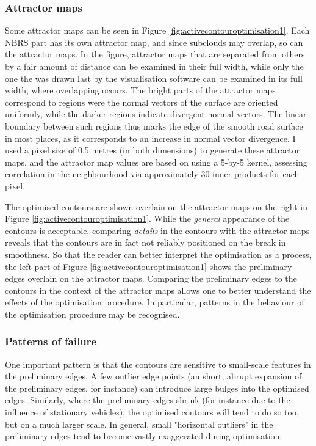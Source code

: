\subsubsection{Attractor maps}

Some attractor maps can be seen in Figure \ref{fig:activecontouroptimisation1}. Each NBRS part has its own attractor map, and since subclouds may overlap, so can the attractor maps. In the figure, attractor maps that are separated from others by a fair amount of distance can be examined in their full width, while only the one the was drawn last by the visualisation software can be examined in its full width, where overlapping occurs. The bright parts of the attractor maps correspond to regions were the normal vectors of the surface are oriented uniformly, while the darker regions indicate divergent normal vectors. The linear boundary between such regions thus marks the edge of the smooth road surface in most places, as it corresponds to an increase in normal vector divergence. I used a pixel size of 0.5 metres (in both dimensions) to generate these attractor maps, and the attractor map values are based on using a 5-by-5 kernel, assessing correlation in the neighbourhood via approximately 30 inner products for each pixel.

The optimised contours are shown overlain on the attractor maps on the right in Figure \ref{fig:activecontouroptimisation1}. While the \textit{general} appearance of the contours is acceptable, comparing \textit{details} in the contours with the attractor maps reveals that the contours are in fact not reliably positioned on the break in smoothness. So that the reader can better interpret the optimisation as a process, the left part of Figure \ref{fig:activecontouroptimisation1} shows the preliminary edges overlain on the attractor maps. Comparing the preliminary edges to the contours in the context of the attractor maps allows one to better understand the effects of the optimisation procedure. In particular, patterns in the behaviour of the optimisation procedure may be recognised.

\subsubsection{Patterns of failure}

One important pattern is that the contours are sensitive to small-scale features in the preliminary edges. A few outlier edge points (an short, abrupt expansion of the preliminary edges, for instance) can introduce large bulges into the optimised edges. Similarly, where the preliminary edges shrink (for instance due to the influence of stationary vehicles), the optimised contours will tend to do so too, but on a much larger scale. In general, small "horizontal outliers" in the preliminary edges tend to become vastly exaggerated during optimisation.

